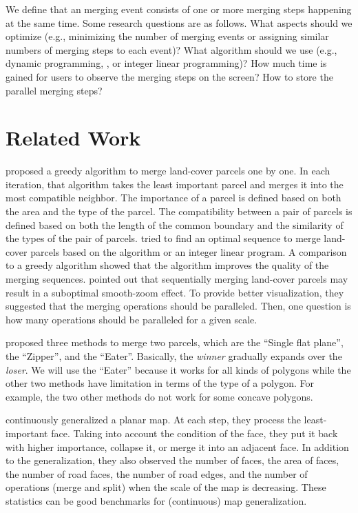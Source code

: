 \documentclass[ijgi,article,submit,moreauthors,pdftex]{Definitions/mdpi}
\begin{document}
We define that an merging event consists of 
one or more merging steps happening at the same time.
Some research questions are as follows.
What aspects should we optimize 
(e.g., minimizing the number of merging events or 
assigning similar numbers of merging steps to each event)?
What algorithm should we use 
(e.g., dynamic programming, \Astar, or integer linear programming)?
How much time is gained for users to observe the merging steps on the screen?
How to store the parallel merging steps?
 
\section{Related Work}
\citet{vanOosterom2005} proposed a greedy algorithm 
to merge land-cover parcels one by one.
In each iteration, that algorithm takes the least important parcel and 
merges it into the most compatible neighbor.
The importance of a parcel is defined 
based on both the area and the type of the parcel.
The compatibility between a pair of parcels is defined based on 
both the length of the common boundary and the similarity of the types 
of the pair of parcels. 
\citet[]{Peng2019Thesis} tried to find an optimal sequence 
to merge land-cover parcels
based on the \Astar algorithm or an integer linear program.
A comparison to a greedy algorithm showed that 
the \Astar algorithm improves the quality of the merging sequences.
\citet{vanOosterom2014Support} pointed out that sequentially merging
land-cover parcels may result in a suboptimal smooth-zoom effect.
To provide better visualization, they suggested that
the merging operations should be paralleled.
Then, one question is how many operations 
should be paralleled for a given scale.

\citet{Suba2014Merge} proposed three methods to merge two parcels, 
which are the ``Single flat plane'', the ``Zipper'', and the ``Eater''.
Basically, the \emph{winner} gradually expands over the \emph{loser}.
We will use the ``Eater'' because it works for all kinds of polygons 
while the other two methods have limitation in terms of the type of a polygon.
For example, the two other methods do not work for some concave polygons.



\citet{Suba2016Road} continuously generalized a planar map.
At each step, they process the least-important face.
Taking into account the condition of the face,
they put it back with higher importance, collapse it, 
or merge it into an adjacent face.
In addition to the generalization, 
they also observed the number of faces,
the area of faces, the number of road faces, the number of road edges,
and the number of operations (merge and split) 
when the scale of the map is decreasing.
These statistics can be good benchmarks for (continuous) map generalization.
\end{document}
